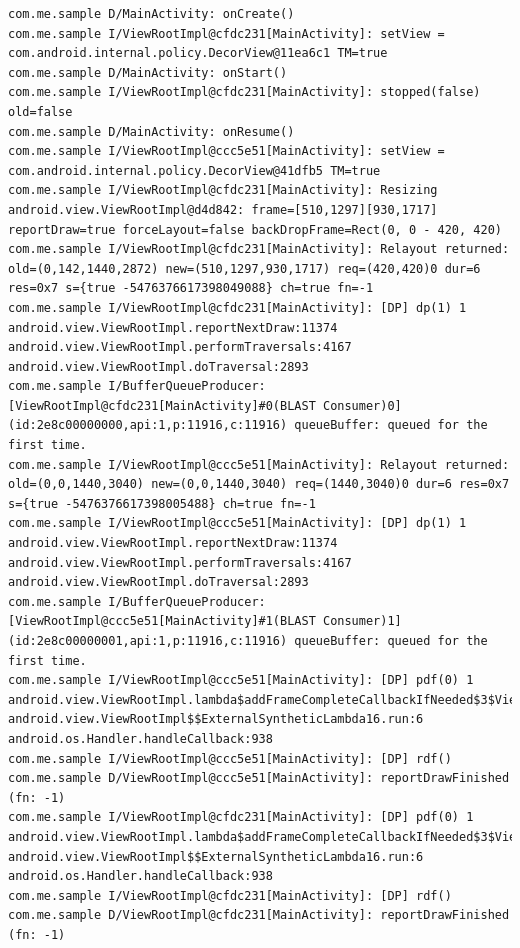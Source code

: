 \documentclass[9pt, b5paper]{article}
\begin{document}
\begin{verbatim}
com.me.sample D/MainActivity: onCreate() 
com.me.sample I/ViewRootImpl@cfdc231[MainActivity]: setView = com.android.internal.policy.DecorView@11ea6c1 TM=true
com.me.sample D/MainActivity: onStart() 
com.me.sample I/ViewRootImpl@cfdc231[MainActivity]: stopped(false) old=false
com.me.sample D/MainActivity: onResume() 
com.me.sample I/ViewRootImpl@ccc5e51[MainActivity]: setView = com.android.internal.policy.DecorView@41dfb5 TM=true
com.me.sample I/ViewRootImpl@cfdc231[MainActivity]: Resizing android.view.ViewRootImpl@d4d842: frame=[510,1297][930,1717] reportDraw=true forceLayout=false backDropFrame=Rect(0, 0 - 420, 420)
com.me.sample I/ViewRootImpl@cfdc231[MainActivity]: Relayout returned: old=(0,142,1440,2872) new=(510,1297,930,1717) req=(420,420)0 dur=6 res=0x7 s={true -5476376617398049088} ch=true fn=-1
com.me.sample I/ViewRootImpl@cfdc231[MainActivity]: [DP] dp(1) 1 android.view.ViewRootImpl.reportNextDraw:11374 android.view.ViewRootImpl.performTraversals:4167 android.view.ViewRootImpl.doTraversal:2893 
com.me.sample I/BufferQueueProducer: [ViewRootImpl@cfdc231[MainActivity]#0(BLAST Consumer)0](id:2e8c00000000,api:1,p:11916,c:11916) queueBuffer: queued for the first time.
com.me.sample I/ViewRootImpl@ccc5e51[MainActivity]: Relayout returned: old=(0,0,1440,3040) new=(0,0,1440,3040) req=(1440,3040)0 dur=6 res=0x7 s={true -5476376617398005488} ch=true fn=-1
com.me.sample I/ViewRootImpl@ccc5e51[MainActivity]: [DP] dp(1) 1 android.view.ViewRootImpl.reportNextDraw:11374 android.view.ViewRootImpl.performTraversals:4167 android.view.ViewRootImpl.doTraversal:2893 
com.me.sample I/BufferQueueProducer: [ViewRootImpl@ccc5e51[MainActivity]#1(BLAST Consumer)1](id:2e8c00000001,api:1,p:11916,c:11916) queueBuffer: queued for the first time.
com.me.sample I/ViewRootImpl@ccc5e51[MainActivity]: [DP] pdf(0) 1 android.view.ViewRootImpl.lambda$addFrameCompleteCallbackIfNeeded$3$ViewRootImpl:4969 android.view.ViewRootImpl$$ExternalSyntheticLambda16.run:6 android.os.Handler.handleCallback:938 
com.me.sample I/ViewRootImpl@ccc5e51[MainActivity]: [DP] rdf()
com.me.sample D/ViewRootImpl@ccc5e51[MainActivity]: reportDrawFinished (fn: -1) 
com.me.sample I/ViewRootImpl@cfdc231[MainActivity]: [DP] pdf(0) 1 android.view.ViewRootImpl.lambda$addFrameCompleteCallbackIfNeeded$3$ViewRootImpl:4969 android.view.ViewRootImpl$$ExternalSyntheticLambda16.run:6 android.os.Handler.handleCallback:938 
com.me.sample I/ViewRootImpl@cfdc231[MainActivity]: [DP] rdf()
com.me.sample D/ViewRootImpl@cfdc231[MainActivity]: reportDrawFinished (fn: -1) 

\end{verbatim}
\end{document}
